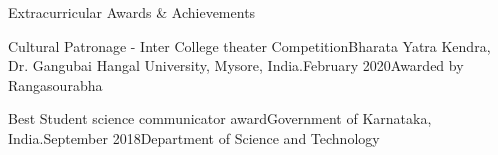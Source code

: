 \begin{section}{Extracurricular Awards \& Achievements}
    \begin{subsectionnobullet}{Cultural Patronage - Inter College theater Competition}{Bharata Yatra Kendra, Dr. Gangubai Hangal University, Mysore, India.}{February 2020}{Awarded by Rangasourabha}
        \item{}
        \vspace{-0.2em}
    \end{subsectionnobullet}
    \vspace{-1.5em}
    \begin{subsectionnobullet}{Best Student science communicator award}{Government of Karnataka, India.}{September 2018}{Department of Science and Technology}
        \item{}
    \end{subsectionnobullet}

\end{section}